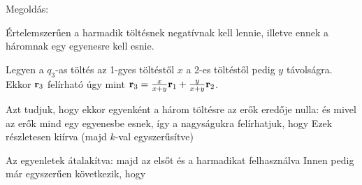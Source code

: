  
\ifdefined\megoldas
 
 Megoldás: 

 Értelemszerűen a harmadik töltésnek negatívnak kell lennie, illetve ennek a háromnak egy egyenesre kell esnie. 

 Legyen a $q_3$-as töltés az 1-gyes töltéstől $x$ a 2-es töltéstől pedig $y$ távolságra. Ekkor $\mathbf{r}_3$ felírható úgy mint $\mathbf{r}_3=\frac{x}{x+y}\mathbf{r}_1+\frac{y}{x+y}\mathbf{r}_2$.

 Azt tudjuk, hogy ekkor egyenként a három töltésre az erők eredője nulla:
 és mivel az erők mind egy egyenesbe esnek, így a nagyságukra felírhatjuk, hogy
 Ezek részletesen kiírva (majd $k$-val egyszerűsítve)

 Az egyenletek átalakítva:
 majd az elsőt és a harmadikat felhasználva
 Innen pedig már egyszerűen következik, hogy 

\fi